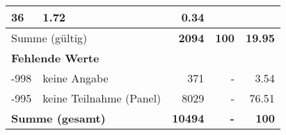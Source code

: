 \begin{longtable}{lXrrr}
       \num{36} &
       \num[round-mode=places,round-precision=2]{1.72} &
         \num[round-mode=places,round-precision=2]{0.34} \\
     \midrule
     \multicolumn{2}{l}{Summe (gültig)} &
       \textbf{\num{2094}} &
     \textbf{\num{100}} &
       \textbf{\num[round-mode=places,round-precision=2]{19.95}} \\
     \multicolumn{5}{l}{\textbf{Fehlende Werte}}\\
       -998 &
       keine Angabe &
         \num{371} &
        - &
         \num[round-mode=places,round-precision=2]{3.54} \\
       -995 &
       keine Teilnahme (Panel) &
         \num{8029} &
        - &
         \num[round-mode=places,round-precision=2]{76.51} \\
     \midrule
     \multicolumn{2}{l}{\textbf{Summe (gesamt)}} &
          \textbf{\num{10494}} &
        \textbf{-} &
        \textbf{\num{100}} \\
     \bottomrule
     \end{longtable}
     

